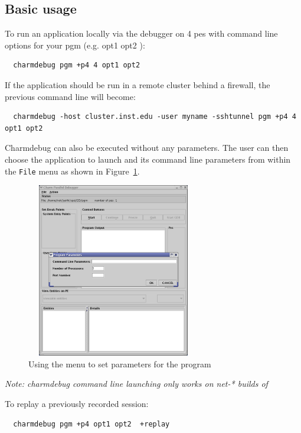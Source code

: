 \documentclass[10pt]{article}
\begin{document}
\subsection{Basic usage}

To run an application locally via the debugger on 4 pes with command line options for your pgm (e.g. opt1 opt2 ):

\begin{verbatim}
  charmdebug pgm +p4 4 opt1 opt2
\end{verbatim}

If the application should be run in a remote cluster behind a firewall, the previous command line will become:

\begin{verbatim}
  charmdebug -host cluster.inst.edu -user myname -sshtunnel pgm +p4 4 opt1 opt2
\end{verbatim}

Charmdebug can also be executed without any parameters.  The user can
then choose the application to launch and its command line parameters
from within the \texttt{File} menu as shown in Figure~\ref{menu}.

\begin{figure}[]
\includegraphics[scale=0.5, height=3in, width=3in]{figs/menu}
\caption{Using the menu to set parameters for the \charmpp{} program}
\label{menu}
\end{figure}


\emph{Note: charmdebug command line launching only works on net-*
builds of \charmpp{} }

To replay a previously recorded session:

\begin{verbatim}
  charmdebug pgm +p4 opt1 opt2  +replay
\end{verbatim}
\end{document}
